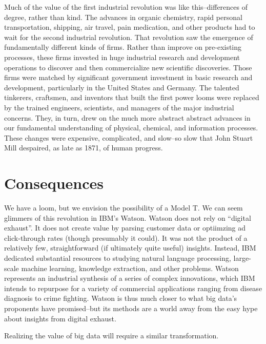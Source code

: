 \documentclass[12pt]{article}
\begin{document}
Much of the value of the first industrial revolution was like
this--differences of degree, rather than kind. The advances in organic
chemistry, rapid personal transportation, shipping, air travel, pain
medication, and other products had to wait for the second industrial
revolution. That revolution saw the emergence of fundamentally
different kinds of firms. Rather than improve on pre-existing
processes, these firms invested in huge industrial research and
development operations to discover and then commercialize new
scientific discoveries. Those firms were matched by significant
government investment in basic research and development, particularly
in the United States and Germany. The talented tinkerers, craftsmen,
and inventors that built the first power looms were replaced by the
trained engineers, scientists, and managers of the major industrial
concerns. They, in turn, drew on the much more abstract abstract
advances in our fundamental understanding of physical, chemical, and
information processes. These changes were expensive, complicated, and
slow--so slow that John Stuart Mill despaired, as late as 1871, of
human progress.


\section{Consequences}
\label{sec:consequences}

We have a loom, but we envision the possibility of a Model T.  We can
seem glimmers of this revolution in IBM's Watson. Watson does not rely
on ``digital exhaust''. It does not create value by parsing customer
data or optiimzing ad click-through rates (though presumably it
could). It was not the product of a relatively few, straightforward
(if ultimately quite useful) insights. Instead, IBM dedicated
substantial resources to studying natural language processing,
large-scale machine learning, knowledge extraction, and other
problems. Watson represents an industrial synthesis of a series of
complex innovations, which IBM intends to repurpose for a variety of
commercial applications ranging from disease diagnosis to crime
fighting. Watson is thus much closer to what big data's proponents
have promised--but its methods are a world away from the easy hype
about insights from digital exhaust.

Realizing the value of big data will require a similar
transformation. 

\end{document}
